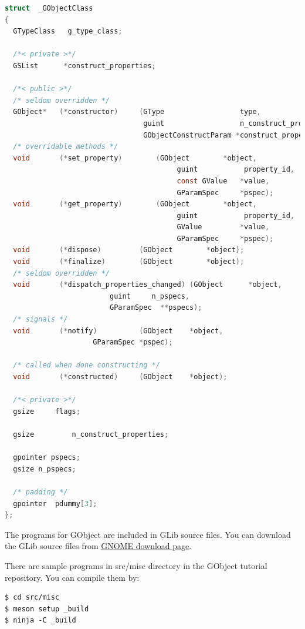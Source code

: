 \begin{lstlisting}[language=C]
struct  _GObjectClass
{
  GTypeClass   g_type_class;

  /*< private >*/
  GSList      *construct_properties;

  /*< public >*/
  /* seldom overridden */
  GObject*   (*constructor)     (GType                  type,
                                 guint                  n_construct_properties,
                                 GObjectConstructParam *construct_properties);
  /* overridable methods */
  void       (*set_property)        (GObject        *object,
                                         guint           property_id,
                                         const GValue   *value,
                                         GParamSpec     *pspec);
  void       (*get_property)        (GObject        *object,
                                         guint           property_id,
                                         GValue         *value,
                                         GParamSpec     *pspec);
  void       (*dispose)         (GObject        *object);
  void       (*finalize)        (GObject        *object);
  /* seldom overridden */
  void       (*dispatch_properties_changed) (GObject      *object,
                         guint     n_pspecs,
                         GParamSpec  **pspecs);
  /* signals */
  void       (*notify)          (GObject    *object,
                     GParamSpec *pspec);

  /* called when done constructing */
  void       (*constructed)     (GObject    *object);

  /*< private >*/
  gsize     flags;

  gsize         n_construct_properties;

  gpointer pspecs;
  gsize n_pspecs;

  /* padding */
  gpointer  pdummy[3];
};
\end{lstlisting}

The programs for GObject are included in GLib source files. You can
download the GLib source files from
\href{https://download.gnome.org/sources/glib/}{GNOME download page}.

There are sample programs in src/misc directory in the GObject tutorial
repository. You can compile them by:

\begin{lstlisting}
$ cd src/misc
$ meson setup _build
$ ninja -C _build
\end{lstlisting}


